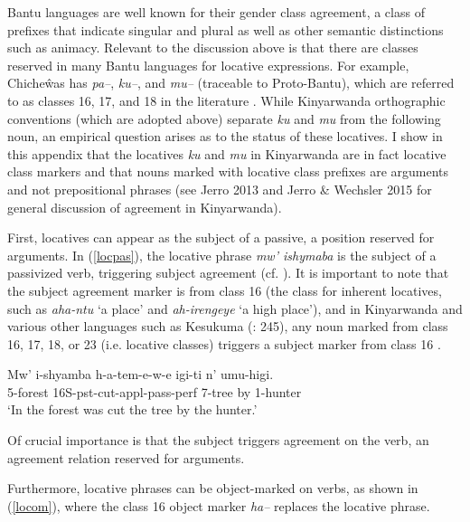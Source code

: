 \documentclass[output=paper]{langsci/langscibook}
\begin{document}
 Bantu languages are well known for their gender class agreement, a class of prefixes that indicate singular and plural as well as other semantic distinctions such as animacy. Relevant to the discussion above is that there are classes reserved in many Bantu languages for locative expressions. For example, Chiche\^was has \emph{pa--}, \emph{ku--}, and \emph{mu--} (traceable to Proto-Bantu), which are referred to as classes 16, 17, and 18 in the literature \citep{bresnan:1989,bresnan:1994,bresnanmchombo:1995,maho:1999,marten:2010}. While Kinyarwanda orthographic conventions (which are adopted above) separate \emph{ku} and \emph{mu} from the following noun, an empirical question arises as to the status of these locatives. I show in this appendix that the locatives \emph{ku} and \emph{mu} in Kinyarwanda are in fact locative class markers and that nouns marked with locative class prefixes are arguments and not prepositional phrases (see Jerro 2013 and Jerro \& Wechsler 2015 for general discussion of agreement in Kinyarwanda).
 
 
First, locatives can appear as the subject of a passive, a position reserved for arguments. In (\ref{locpas}), the locative phrase \emph{mw' ishymaba} is the subject of a passivized verb, triggering subject agreement (cf. \citealt{bresnan:1989,bresnan:1994}). It is important to note that the subject agreement marker is from class 16 (the class for inherent locatives, such as \emph{aha-ntu} `a place' and \emph{ah-irengeye} `a high place'), and in Kinyarwanda and various other languages such as Kesukuma (\citealt{batibo:1985}: 245), any noun marked from class 16, 17, 18, or 23 (i.e. locative classes) triggers a subject marker from class 16  \citep{maho:1999}.


\begin{exe}

	\ex\label{locpas}\gll Mw' i-shyamba h-a-tem-e-w-e igi-ti n' umu-higi.\\
			{} 5-forest 16S-{\sc pst}-cut-{\sc appl-pass-perf} 7-tree by 1-hunter\\
			\glt `In the forest was cut the tree by the hunter.'

\end{exe}
%
 Of crucial importance is that the subject triggers agreement on the verb, an agreement relation reserved for arguments.  



Furthermore, locative phrases can be object-marked on verbs, as shown in (\ref{locom}), where the class 16 object marker \emph{ha--} replaces the locative phrase. 
\end{document}
